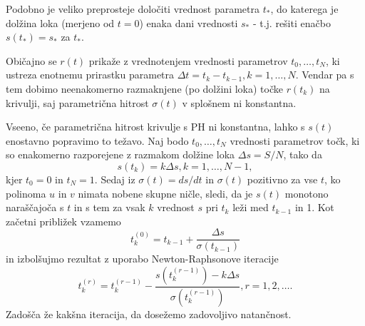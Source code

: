\documentclass[a4paper]{article}
\begin{document}
	Podobno je veliko preprosteje določiti vrednost parametra $t_*$, do katerega je dolžina loka (merjeno od $t = 0$) enaka dani vrednosti $s_*$ - t.j. rešiti enačbo $s (t_*) = s_*$ za $t_*$.
	
	Običajno se $r (t)$ prikaže z vrednotenjem vrednosti parametrov $t_0,\ldots , t_N$, ki ustreza enotnemu prirastku parametra $\Delta t = t_k- t_{k- 1}, k = 1,\ldots , N$. Vendar pa s tem dobimo neenakomerno razmaknjene (po dolžini loka) točke $r (t_k)$ na krivulji, saj parametrična hitrost $\sigma (t)$ v splošnem ni konstantna.
	
	Vseeno, če parametrična hitrost krivulje s PH ni konstantna, lahko s $s (t)$ enostavno popravimo to težavo. Naj bodo $t_0,\ldots, t_N$ vrednosti parametrov točk, ki so enakomerno razporejene z razmakom dolžine loka $\Delta s = S / N$, tako da
	$$s (t_k) = k\Delta s, k = 1,\ldots , N - 1,$$
	kjer $t_0 = 0$ in $t_N = 1$. Sedaj iz $\sigma (t) = ds / dt$ in $\sigma (t)$ pozitivno za vse $t$, ko polinoma $u$ in $v$ nimata nobene skupne ničle, sledi, da je $s (t)$ monotono naraščajoča s $t$ in s tem za vsak $k$ vrednost $s$ pri $t_k$ leži med $t_{k - 1}$ in 1. Kot začetni približek vzamemo
	$$t^{(0)}_k = t_{k-1}+\frac{\Delta s}{\sigma(t_{k-1})}$$
	in izbolšujmo rezultat z uporabo Newton-Raphsonove iteracije
	$$t^{(r)}_k = t^{(r-1)}_k-\frac{s(t^{(r-1)}_k)-k\Delta s}{\sigma(t^{(r-1)}_k)}, r = 1, 2,\ldots.$$
	Zadošča že kakšna iteracija, da dosežemo zadovoljivo natančnost.
	
\end{document}
